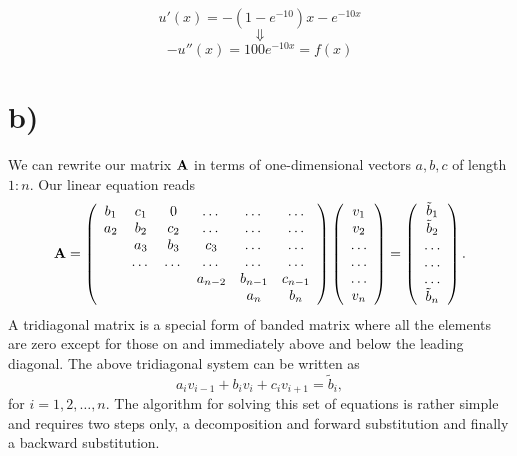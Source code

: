 \documentclass[12pt]{article}
\begin{document}
\begin{flushleft}
$$u'(x) = -(1-e^{-10})x-e^{-10x}$$
$$\Downarrow$$
$$-u''(x) = 100e^{-10x} = f(x)$$

\section*{b)}
We can rewrite our matrix ${\bf A}$ in terms of one-dimensional vectors $a,b,c$  
of length $1:n$. 
Our linear equation reads
\begin{equation}
    {\bf A} = \left(\begin{array}{cccccc}
                           b_1& c_1 & 0 &\dots   & \dots &\dots \\
                           a_2 & b_2 & c_2 &\dots &\dots &\dots \\
                           & a_3 & b_3 & c_3 & \dots & \dots \\
                           & \dots   & \dots &\dots   &\dots & \dots \\
                           &   &  &a_{n-2}  &b_{n-1}& c_{n-1} \\
                           &    &  &   &a_n & b_n \\
                      \end{array} \right)\left(\begin{array}{c}
                           v_1\\
                           v_2\\
                           \dots \\
                          \dots  \\
                          \dots \\
                           v_n\\
                      \end{array} \right)
  =\left(\begin{array}{c}
                           \tilde{b}_1\\
                           \tilde{b}_2\\
                           \dots \\
                           \dots \\
                          \dots \\
                           \tilde{b}_n\\
                      \end{array} \right).
\end{equation}
A tridiagonal matrix is a special form of banded matrix where all the elements are zero except for 
those on and immediately above and below the leading diagonal.
The above tridiagonal system   can be written as
\begin{equation}
  a_iv_{i-1}+b_iv_i+c_iv_{i+1} = \tilde{b}_i,
\end{equation}
for $i=1,2,\dots,n$. 
The algorithm for solving this set of equations is rather simple and requires two steps only, a decomposition 
and forward substitution and finally a backward substitution. 



\end{flushleft}
\end{document}
